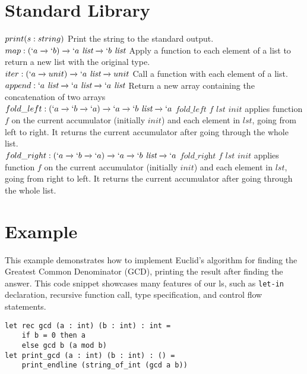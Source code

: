 \documentclass[journal]{IEEEtran}
\begin{document}
\section{Standard Library}
$print(s : string)\\$
Print the string to the standard output.\\

$map : (\lq a \xrightarrow[]{} \lq b) \xrightarrow[]{} \lq a \textit{ list} \xrightarrow[]{} \lq b\textit{ list}\\$
Apply a function to each element of a list to return a new list with the original type.\\

$iter : (\lq a \xrightarrow[]{} unit) \xrightarrow[]{} \lq a \textit{ list} \xrightarrow[]{} unit\\$
Call a function with each element of a list.\\

$append : \lq a \textit{ list} \xrightarrow[]{} \lq a \textit{ list} \xrightarrow[]{} \lq a \textit{ list}\\$
Return a new array containing the concatenation of two arrays\\

$fold\_left : (\lq a \xrightarrow[]{} \lq b \xrightarrow[]{} \lq a) \xrightarrow[]{} \lq a \xrightarrow[]{} \lq b \textit{ list} \xrightarrow[]{} \lq a\\$
$\textit{fold\_left f lst init}$ applies function $f$ on the current accumulator (initially $init$) and each element in $lst$, going from left to right. It returns the current accumulator after going through the whole list.\\

$fold\_right : (\lq a \xrightarrow[]{} \lq b \xrightarrow[]{} \lq a) \xrightarrow[]{} \lq a \xrightarrow[]{} \lq b \textit{ list} \xrightarrow[]{} \lq a\\$
$\textit{fold\_right f lst init}$ applies function $f$ on the current accumulator (initially $init$) and each element in $lst$, going from right to left. It returns the current accumulator after going through the whole list.



\section{Example}
This example demonstrates how to implement Euclid's algorithm for finding the Greatest Common Denominator (GCD), printing the result after finding the answer.  This code snippet showcases many features of our ls, such as \texttt{let-in} declaration, recursive function call, type specification, and control flow statements.
\begin{verbatim}
let rec gcd (a : int) (b : int) : int =
    if b = 0 then a 
    else gcd b (a mod b)
let print_gcd (a : int) (b : int) : () =
    print_endline (string_of_int (gcd a b)) 
\end{verbatim}
\end{document}
